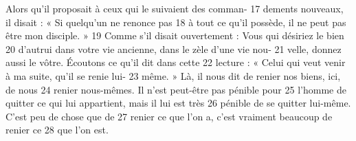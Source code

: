 Alors qu'il proposait à ceux qui le suivaient des comman-	 
17	 	dements nouveaux, il disait : « Si quelqu'un ne renonce pas	 
18	 	à tout ce qu'il possède, il ne peut pas être mon disciple. »	 
19	 	Comme s'il disait ouvertement : Vous qui désiriez le bien	 
20	 	d'autrui dans votre vie ancienne, dans le zèle d'une vie nou-	 
21	 	velle, donnez aussi le vôtre. Écoutons ce qu'il dit dans cette	 
22	 	lecture : « Celui qui veut venir à ma suite, qu'il se renie lui-	 
23	 	même. » Là, il nous dit de renier nos biens, ici, de nous	 
24	 	renier nous-mêmes. Il n'est peut-être pas pénible pour	 
25	 	l'homme de quitter ce qui lui appartient, mais il lui est très	 
26	 	pénible de se quitter lui-même. C'est peu de chose que de	 
27	 	renier ce que l'on a, c'est vraiment beaucoup de renier ce	 
28	 	que l'on est.